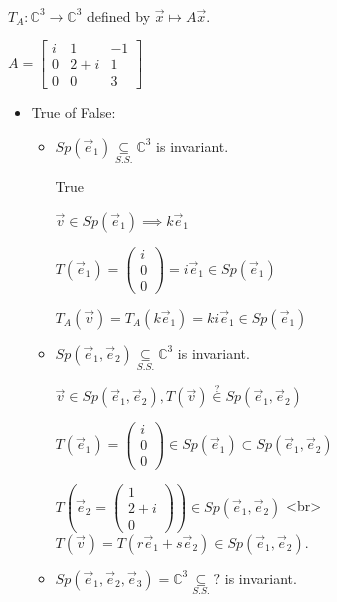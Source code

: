 \documentclass[11pt,fleqn]{book} %
\begin{document}
\begin{example}
{~~~}

    $T_A: \mathbb{C}^3 \to \mathbb{C}^3$ defined by $\vec{x} \mapsto A\vec{x}$.

    $A = \begin{bmatrix} i &1 &-1 \\ 0 &2+i &1 \\ 0 &0 &3 \end{bmatrix}$

    \begin{itemize}
        \item True of False:

        \begin{itemize}
            \item $Sp(\vec{e}_1)\underset{S.S.}{\subseteq} \mathbb{C}^3$ is invariant.

            True

            $\vec{v} \in Sp(\vec{e}_1) \implies k\vec{e}_1$

            $T(\vec{e}_1) = \begin{pmatrix} i \\ 0 \\ 0 \end{pmatrix} = i\vec{e}_1 \in Sp(\vec{e}_1)$

            $T_A(\vec{v}) = T_A(k\vec{e}_1) = ki\vec{e}_1 \in Sp(\vec{e}_1)$

            \item $Sp(\vec{e}_1, \vec{e}_2)\underset{S.S.}{\subseteq} \mathbb{C}^3$ is invariant.

            $\vec{v} \in Sp(\vec{e}_1, \vec{e}_2), T(\vec{v})\overset{?}{\in}Sp(\vec{e}_1, \vec{e}_2)$

            $T(\vec{e}_1) = \begin{pmatrix} i \\ 0 \\ 0 \end{pmatrix} \in Sp(\vec{e}_1) \subset Sp(\vec{e}_1, \vec{e}_2)$

            $T(\vec{e}_2 = \begin{pmatrix} 1 \\ 2+i \\ 0 \end{pmatrix}) \in Sp(\vec{e}_1, \vec{e}_2)$ <br> $T(\vec{v}) = T(r\vec{e}_1+s\vec{e}_2) \in Sp(\vec{e}_1, \vec{e}_2)$.

            \item $Sp(\vec{e}_1, \vec{e}_2, \vec{e}_3) = \mathbb{C}^3 \underset{S.S.}{\subseteq} ?$ is invariant.


\end{itemize}
\end{itemize}
\end{example}
\end{document}

